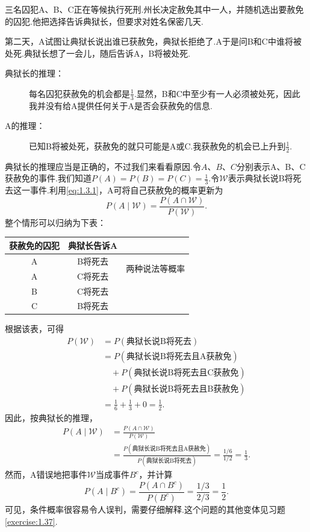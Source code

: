 \begin{example}[三名囚犯]\label{ex:1.3.4}
三名囚犯A、B、C正在等候执行死刑.州长决定赦免其中一人，并随机选出要赦免的囚犯.他把选择告诉典狱长，但要求对姓名保密几天.

第二天，A试图让典狱长说出谁已获赦免，典狱长拒绝了.A于是问B和C中谁将被处死.典狱长想了一会儿，随后告诉A，B将被处死.
\begin{description}
\item[典狱长的推理：]每名囚犯获赦免的机会都是$\frac13$.显然，B和C中至少有一人必须被处死，因此我并没有给A提供任何关于A是否会获赦免的信息.
\item[A的推理：]已知B将被处死，获赦免的就只可能是A或C.我获赦免的机会已上升到$\frac12$.
\end{description}
典狱长的推理应当是正确的，不过我们来看看原因.令$A$、$B$、$C$分别表示A、B、C获赦免的事件.我们知道$P(A)=P(B)=P(C)=\frac13$.令$\mathscr W$表示典狱长说B将死去这一事件.利用\eqref{eq:1.3.1}，A可将自己获赦免的概率更新为
$$P(A\mid\mathscr W)=\frac{P(A\cap\mathscr W)}{P(\mathscr W)}.$$
整个情形可以归纳为下表：
\begin{center}
\begin{tabular}{ccc}\hline
获赦免的囚犯&典狱长告诉A&\\\hline
A&B将死去&\multirow{2}{*}{两种说法等概率}\\
A&C将死去&\\
B&C将死去&\\
C&B将死去&\\\hline
\end{tabular}
\end{center}
根据该表，可得
\begin{equation*}\begin{aligned}
P(\mathscr W)&=P(\text{典狱长说B将死去})\\
&=P(\text{典狱长说B将死去且A获赦免})\\
&\quad+P(\text{典狱长说B将死去且C获赦免})\\
&\quad+P(\text{典狱长说B将死去且B获赦免})\\
&=\frac16+\frac13+0=\frac12.
\end{aligned}\end{equation*}
因此，按典狱长的推理，
\begin{equation}\label{eq:1.3.2}\begin{aligned}
P(A\mid\mathscr W)&=\frac{P(A\cap\mathscr W)}{P(\mathscr W)}\\
&=\frac{P(\text{典狱长说B将死去且A获赦免})}{P(\text{典狱长说B将死去})}
=\frac{1/6}{1/2}=\frac13.
\end{aligned}\end{equation}
然而，A错误地把事件$\mathscr W$当成事件$B^c$，并计算
$$P(A\mid B^c)=\frac{P(A\cap B^c)}{P(B^c)}=\frac{1/3}{2/3}=\frac12.$$
可见，条件概率很容易令人误判，需要仔细解释.这个问题的其他变体见习题\ref{exercise:1.37}.
\end{example}

